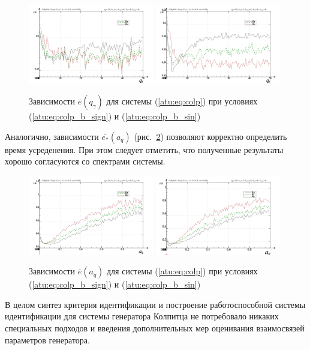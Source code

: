 \begin{figure}[htb!]
\centerline{
  \includegraphics[width=0.49\textwidth]{p/cha/colp/colp_m5p-p_qg_e_sign.png}
  \includegraphics[width=0.49\textwidth]{p/cha/colp/colp_m5p-p_qg_e_sin.png}
}
  \caption{Зависимости  $\bar{e}(q_\gamma)$ для системы (\ref{atu:eq:colp})
  при условиях (\ref{atu:eq:colp_b_sign}) и (\ref{atu:eq:colp_b_sin})
}
\label{atu:f:colp_e_qgamma}
\end{figure}



Аналогично, зависимости $\bar{e_*}(a_q)$ (рис.~\ref{atu:f:colp_e_a_q})
позволяют корректно определить время усреденения.
При этом следует отметить, что
полученные результаты хорошо согласуются со спектрами системы.

\begin{figure}[htb!]
\centerline{
  \includegraphics[width=0.49\textwidth]{p/cha/colp/colp_m5p-p_a_q_e_sign.png}
  \includegraphics[width=0.49\textwidth]{p/cha/colp/colp_m5p-p_a_q_e_sin.png}
}
  \caption{Зависимости  $\bar{e}(a_q)$ для системы (\ref{atu:eq:colp})
  при условиях (\ref{atu:eq:colp_b_sign}) и (\ref{atu:eq:colp_b_sin})
}
\label{atu:f:colp_e_a_q}
\end{figure}

В целом синтез критерия идентификации и построение работоспособной системы идентификации для
системы генератора Колпитца не потребовало никаких специальных подходов и введения дополнительных
мер оценивания взаимосвязей параметров генератора.

